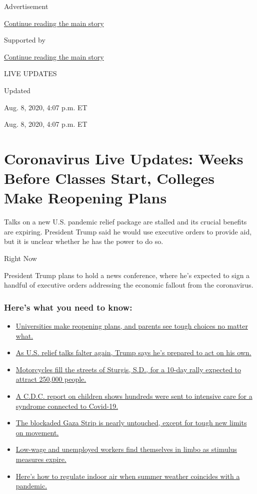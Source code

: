 Advertisement

\protect\hyperlink{after-top}{Continue reading the main story}

Supported by

\protect\hyperlink{after-sponsor}{Continue reading the main story}

LIVE UPDATES

Updated~

Aug. 8, 2020, 4:07 p.m. ET

Aug. 8, 2020, 4:07 p.m. ET

\hypertarget{coronavirus-live-updates-weeks-before-classes-start-colleges-make-reopening-plans}{%
\section{Coronavirus Live Updates: Weeks Before Classes Start, Colleges
Make Reopening
Plans}\label{coronavirus-live-updates-weeks-before-classes-start-colleges-make-reopening-plans}}

Talks on a new U.S. pandemic relief package are stalled and its crucial
benefits are expiring. President Trump said he would use executive
orders to provide aid, but it is unclear whether he has the power to do
so.

Right Now

President Trump plans to hold a news conference, where he's expected to
sign a handful of executive orders addressing the economic fallout from
the coronavirus.

\hypertarget{heres-what-you-need-to-know}{%
\subsubsection{Here's what you need to
know:}\label{heres-what-you-need-to-know}}

\begin{itemize}
\tightlist
\item
  \protect\hyperlink{link-7bd2f2ea}{Universities make reopening plans,
  and parents see tough choices no matter what.}
\item
  \protect\hyperlink{link-182e4a8e}{As U.S. relief talks falter again,
  Trump says he's prepared to act on his own.}
\item
  \protect\hyperlink{link-6d42ce45}{Motorcycles fill the streets of
  Sturgis, S.D., for a 10-day rally expected to attract 250,000 people.}
\item
  \protect\hyperlink{link-57c61e05}{A C.D.C. report on children shows
  hundreds were sent to intensive care for a syndrome connected to
  Covid-19.}
\item
  \protect\hyperlink{link-bb0ce1a}{The blockaded Gaza Strip is nearly
  untouched, except for tough new limits on movement.}
\item
  \protect\hyperlink{link-1f7e24cf}{Low-wage and unemployed workers find
  themselves in limbo as stimulus measures expire.}
\item
  \protect\hyperlink{link-5bad68cc}{Here's how to regulate indoor air
  when summer weather coincides with a pandemic.}
\end{itemize}

